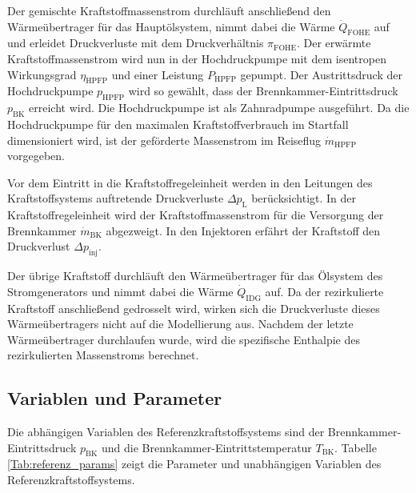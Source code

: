 Der gemischte Kraftstoffmassenstrom durchläuft anschließend den Wärmeübertrager für das Hauptölsystem, nimmt dabei die Wärme $\dot{Q}_{\mathrm{FOHE}}$ auf und erleidet Druckverluste mit dem Druckverhältnis $\pi_{\mathrm{FOHE}}$. Der erwärmte Kraftstoffmassenstrom wird nun in der Hochdruckpumpe mit dem isentropen Wirkungsgrad $\eta_{\mathrm{HPFP}}$ und einer Leistung $P_{\mathrm{HPFP}}$ gepumpt. Der Austrittsdruck der Hochdruckpumpe $p_{\mathrm{HPFP}}$ wird so gewählt, dass der Brennkammer-Eintrittsdruck $p_{\mathrm{BK}}$ erreicht wird. Die Hochdruckpumpe ist als Zahnradpumpe ausgeführt. Da die Hochdruckpumpe für den maximalen Kraftstoffverbrauch im Startfall dimensioniert wird, ist der geförderte Massenstrom im Reiseflug $\dot{m}_{\mathrm{HPFP}}$ vorgegeben. 

Vor dem Eintritt in die Kraftstoffregeleinheit werden in den Leitungen des Kraftstoffsystems auftretende Druckverluste $\Delta p_{\mathrm{L}}$  berücksichtigt. In der Kraftstoffregeleinheit wird der Kraftstoffmassenstrom für die Versorgung der Brennkammer $\dot{m}_{\mathrm{BK}}$ abgezweigt. In den Injektoren erfährt der Kraftstoff den Druckverlust $\Delta p_{\mathrm{inj}}$. 

Der übrige Kraftstoff durchläuft den Wärmeübertrager für das Ölsystem des Stromgenerators und nimmt dabei die Wärme $\dot{Q}_{\mathrm{IDG}}$ auf. Da der rezirkulierte Kraftstoff anschließend gedrosselt wird, wirken sich die Druckverluste dieses Wärmeübertragers nicht auf die Modellierung aus. Nachdem der letzte Wärmeübertrager durchlaufen wurde, wird die spezifische Enthalpie des rezirkulierten Massenstroms berechnet.

\subsection{Variablen und Parameter}

Die abhängigen Variablen des Referenzkraftstoffsystems sind der Brennkammer-Eintrittsdruck $p_{\mathrm{BK}}$ und die Brennkammer-Eintrittstemperatur $T_{\mathrm{BK}}$. Tabelle \ref{Tab:referenz_params} zeigt die Parameter und unabhängigen Variablen des Referenzkraftstoffsystems.

